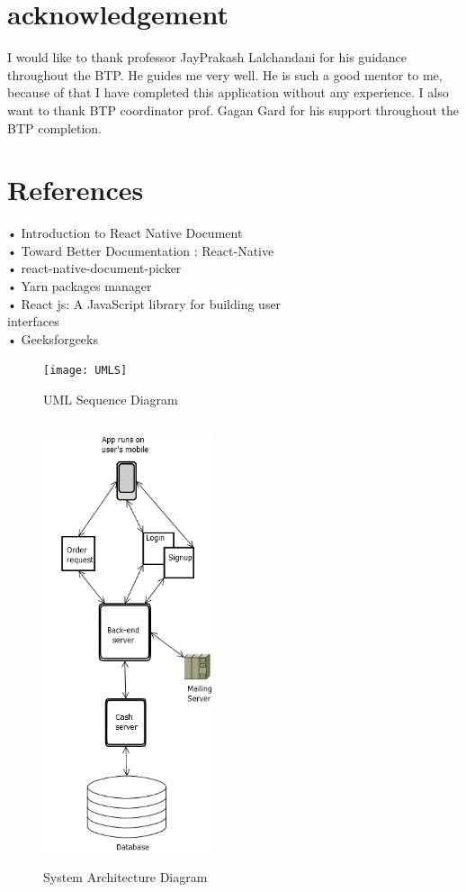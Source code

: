 \documentclass[conference]{IEEEtran}
\begin{document}
\section{acknowledgement}
I would like to thank professor JayPrakash Lalchandani for his guidance throughout the BTP. He guides me very well. He is such a good mentor to me, because of that I have completed this application without any experience. I also want to thank BTP coordinator prof. Gagan Gard for his support throughout the BTP completion.\\

\section{References}
• Introduction to React Native Document\\
• Toward Better Documentation : React-Native\\
• react-native-document-picker\\
• Yarn packages manager\\
• React js: A JavaScript library for building user\\
interfaces\\
• Geeksforgeeks\\

\begin{figure}[h!]
\centering
\texttt{[image: UMLS]}
\caption{UML Sequence Diagram}
\end{figure}


\begin{figure}[h!]
\centering
\includegraphics[width=5cm,height=13cm]{images/Architecture.png}
\caption{System Architecture Diagram}
\end{figure}
\end{document}
